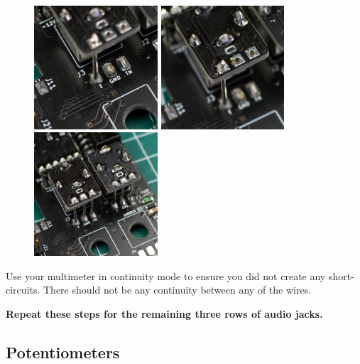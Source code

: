 \documentclass[12pt, a4paper]{article}
\begin{document}
\begin{figure}[H]
    \centering
    \includegraphics[width=46mm]{images/section_3-3_single_bot.jpg}
    \hspace{2mm}
    \includegraphics[width=46mm]{images/section_3-3_single_top.jpg}
    \hspace{2mm}
    \includegraphics[width=46mm]{images/section_3-3_full.jpg}
\end{figure}

Use your multimeter in continuity mode to ensure you did not create any short-circuits. There
should not be any continuity between any of the wires.

\textbf{Repeat these steps for the remaining three rows of audio jacks.}

\pagebreak
\subsection{Potentiometers}
\end{document}
